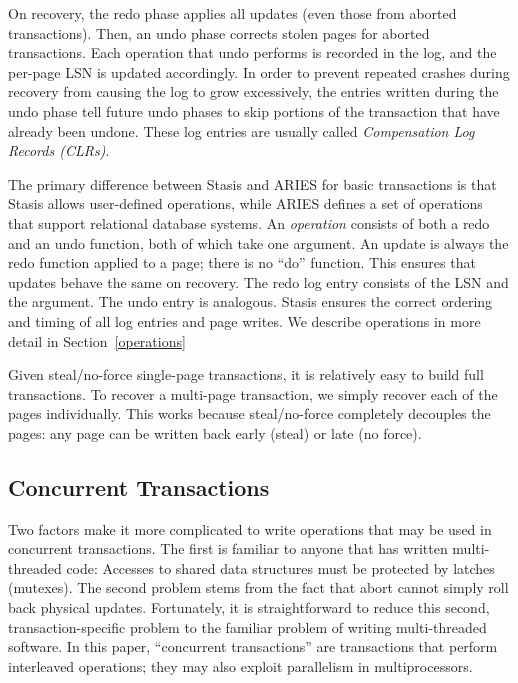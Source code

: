 \documentclass[letterpaper,twocolumn,10pt]{article}
\newcommand{\yad}{Stasis\xspace}
\begin{document}
On recovery, the redo phase applies all updates (even those from
aborted transactions).  Then, an undo phase corrects stolen pages for
aborted transactions.  Each operation that undo performs is recorded
in the log, and the per-page LSN is updated accordingly.  In order to
prevent repeated crashes during recovery from causing the log to grow
excessively, the entries written during the undo phase tell future
undo phases to skip portions of the transaction that have already been
undone.  These log entries are usually called {\em Compensation Log
Records (CLRs)}.


The primary difference between \yad and ARIES for basic transactions
is that \yad allows user-defined operations, while ARIES defines a set
of operations that support relational database systems.  An {\em
operation} consists of both a redo and an undo function, both of which
take one argument. An update is always the redo function applied to a
page; there is no ``do'' function.  This ensures that updates behave
the same on recovery.  The redo log entry consists of the LSN and the
argument.  The undo entry is analogous.  \yad ensures the correct ordering and timing
of all log entries and page writes.  We describe operations in more
detail in Section~\ref{operations}


Given steal/no-force single-page transactions, it is relatively easy
to build full transactions. 
To recover a multi-page transaction, we simply recover each of
the pages individually.  This works because steal/no-force completely
decouples the pages: any page can be written back early (steal) or
late (no force).  

\subsection{Concurrent Transactions}
\label{sec:nta}

Two factors make it more complicated to write operations that may be
used in concurrent transactions.  The first is familiar to anyone that
has written multi-threaded code: Accesses to shared data structures
must be protected by latches (mutexes).  The second problem stems from
the fact that abort cannot simply roll back physical updates.
Fortunately, it is straightforward to reduce this second,
transaction-specific problem to the familiar problem of writing
multi-threaded software.  In this paper, ``concurrent
transactions'' are transactions that perform interleaved operations; they may also exploit parallelism in multiprocessors.
\end{document}
